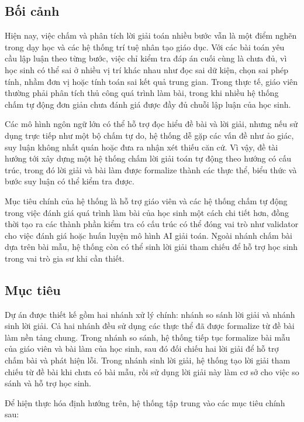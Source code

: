 \documentclass[12pt,a4paper]{article}
\begin{document}
\subsection{Bối cảnh}
Hiện nay, việc chấm và phân tích lời giải toán nhiều bước vẫn là một điểm nghẽn trong dạy học và các hệ thống trí tuệ nhân tạo giáo dục. Với các bài toán yêu cầu lập luận theo từng bước, việc chỉ kiểm tra đáp án cuối cùng là chưa đủ, vì học sinh có thể sai ở nhiều vị trí khác nhau như đọc sai dữ kiện, chọn sai phép tính, nhầm đơn vị hoặc tính toán sai kết quả trung gian. Trong thực tế, giáo viên thường phải phân tích thủ công quá trình làm bài, trong khi nhiều hệ thống chấm tự động đơn giản chưa đánh giá được đầy đủ chuỗi lập luận của học sinh.

Các mô hình ngôn ngữ lớn có thể hỗ trợ đọc hiểu đề bài và lời giải, nhưng nếu sử dụng trực tiếp như một bộ chấm tự do, hệ thống dễ gặp các vấn đề như ảo giác, suy luận không nhất quán hoặc đưa ra nhận xét thiếu căn cứ. Vì vậy, đề tài hướng tới xây dựng một hệ thống chấm lời giải toán tự động theo hướng có cấu trúc, trong đó lời giải và bài làm được formalize thành các thực thể, biểu thức và bước suy luận có thể kiểm tra được.

Mục tiêu chính của hệ thống là hỗ trợ giáo viên và các hệ thống chấm tự động trong việc đánh giá quá trình làm bài của học sinh một cách chi tiết hơn, đồng thời tạo ra các thành phần kiểm tra có cấu trúc có thể đóng vai trò như validator cho việc đánh giá hoặc huấn luyện mô hình AI giải toán. Ngoài nhánh chấm bài dựa trên bài mẫu, hệ thống còn có thể sinh lời giải tham chiếu để hỗ trợ học sinh trong vai trò gia sư khi cần thiết.

\subsection{Mục tiêu}

Dự án được thiết kế gồm hai nhánh xử lý chính: nhánh so sánh lời giải và nhánh sinh lời giải. Cả hai nhánh đều sử dụng các thực thể đã được formalize từ đề bài làm nền tảng chung. Trong nhánh so sánh, hệ thống tiếp tục formalize bài mẫu của giáo viên và bài làm của học sinh, sau đó đối chiếu hai lời giải để hỗ trợ chấm bài và phát hiện lỗi. Trong nhánh sinh lời giải, hệ thống tạo lời giải tham chiếu từ đề bài khi chưa có bài mẫu, rồi sử dụng lời giải này làm cơ sở cho việc so sánh và hỗ trợ học sinh.

Để hiện thực hóa định hướng trên, hệ thống tập trung vào các mục tiêu chính sau:
\end{document}
